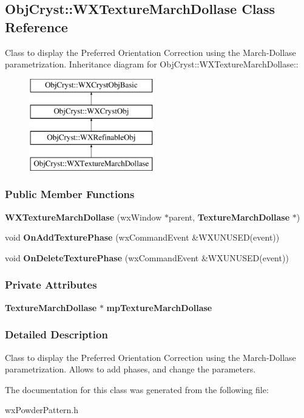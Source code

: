\subsection{ObjCryst::WXTextureMarchDollase Class Reference}
\label{a00147}


Class to display the Preferred Orientation Correction using the March-\/Dollase parametrization.  
Inheritance diagram for ObjCryst::WXTextureMarchDollase::\begin{figure}[H]
\begin{center}
\leavevmode
\includegraphics[height=4cm]{a00147}
\end{center}
\end{figure}
\subsubsection*{Public Member Functions}
\begin{DoxyCompactItemize}
\item 
{\bfseries WXTextureMarchDollase} (wxWindow $\ast$parent, {\bf TextureMarchDollase} $\ast$)\label{a00147_ab8ab6eceeb0c83bf6dc4b6f775e02905}

\item 
void {\bfseries OnAddTexturePhase} (wxCommandEvent \&WXUNUSED(event))\label{a00147_aafd20a474b15713ea0c4fea247a254be}

\item 
void {\bfseries OnDeleteTexturePhase} (wxCommandEvent \&WXUNUSED(event))\label{a00147_ae0f2b94788268422e5a2ca215f49387a}

\end{DoxyCompactItemize}
\subsubsection*{Private Attributes}
\begin{DoxyCompactItemize}
\item 
{\bf TextureMarchDollase} $\ast$ {\bfseries mpTextureMarchDollase}\label{a00147_aac7625565230e97c441006ff2f68dd2e}

\end{DoxyCompactItemize}


\subsubsection{Detailed Description}
Class to display the Preferred Orientation Correction using the March-\/Dollase parametrization. Allows to add phases, and change the parameters. 

The documentation for this class was generated from the following file:\begin{DoxyCompactItemize}
\item 
wxPowderPattern.h\end{DoxyCompactItemize}
